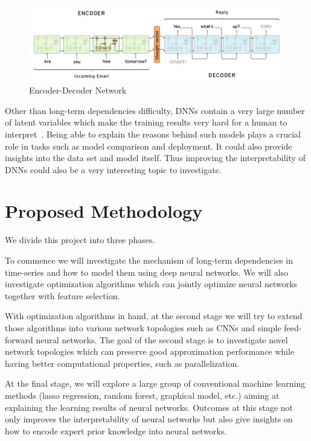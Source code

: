 \message{ !name(usyd_phd_proposal.tex)}\documentclass{article} \usepackage{tabularx}
\begin{document}
\begin{figure}
  \centering
  \includegraphics[scale=0.5]{images/en-de.png}
  \caption{Encoder-Decoder Network}
  \label{fig:en-de}
\end{figure}

Other than long-term dependencies difficulty, DNNs contain a very
large number of latent variables which make the training results
very hard for a human to interpret~\cite{goodfellow2016deep}.
Being able to explain the reasons behind such models plays a
crucial role in tasks such as model comparison and deployment. It
could also provide insights into the data set and model itself.
Thus improving the interpretability of DNNs could also be a very
interesting topic to investigate.


\section{Proposed Methodology}
\label{sec:method}

We divide this project into three phases.

To commence we will investigate the mechanism of long-term
dependencies in time-series and how to model them using deep
neural networks. We will also investigate optimization algorithms
which can jointly optimize neural networks together with feature
selection.

With optimization algorithms in hand, at the second stage we will
try to extend those algorithms into various network topologies
such as CNNs and simple feed-forward neural networks. The goal of
the second stage is to investigate novel network topologies which
can preserve good approximation performance while having better
computational properties, such as parallelization.

At the final stage, we will explore a large group of conventional
machine learning methods (lasso regression, random forest,
graphical model, etc.) aiming at explaining the learning results
of neural networks. Outcomes at this stage not only improves the
interpretability of neural networks but also give insights on how
to encode expert prior knowledge into neural networks.
\end{document}
